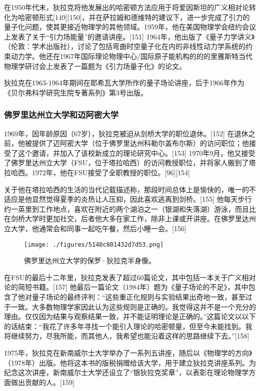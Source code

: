 在1950年代末，狄拉克将他发展出的哈密顿方法应用于将爱因斯坦的广义相对论转化为哈密顿形式[149][150]，并在萨拉姆和德维特的建议下，进一步完成了引力的量子化问题，使其更接近物理学的其他领域。1959年，他在美国物理学会纽约会议上发表了关于“引力场能量”的邀请讲座。[151] 1964年，他出版了《量子力学讲义》（伦敦：学术出版社），讨论了包括弯曲时空量子化在内的非线性动力学系统的约束动力学。他还在1967年国际理论物理中心/国际原子能机构的的的里雅斯特当代物理学研讨会上发表了一篇题为《引力场量子化》的论文。

狄拉克在1963-1964年期间在耶希瓦大学所作的量子场论讲座，后于1966年作为《贝尔弗科学研究生院专著系列》第3号出版。
\subsubsection{佛罗里达州立大学和迈阿密大学}
1969年，因年龄原因（67岁），狄拉克被迫从剑桥大学的职位退休。[152] 在退休之前，他被提供了迈阿密大学（位于佛罗里达州科勒尔盖布尔斯）的访问职位；他接受了这个邀请，并加入了该校新成立的理论研究中心。[153] 1970年9月，他又接受了佛罗里达州立大学（FSU，位于塔拉哈西）的访问教授职位，并将家人搬到了塔拉哈西。1972年，他在FSU接受了全职教授的职位。[96][154]

关于他在塔拉哈西的生活的当代记载描述称，那段时间总体上是愉快的，唯一的不适应是他显然觉得夏季的炎热让人压抑，因此喜欢逃离到剑桥。[155] 他每天步行约一英里到工作地点，喜欢在附近的两个湖泊之一（银湖和失落湖）游泳，而且比在剑桥大学时更加社交，后者他大多在家工作，除非上课或开讲座。在佛罗里达州立大学，他通常会和同事一起吃午餐，然后小睡一会。[156]
\begin{figure}[ht]
\centering
\texttt{[image: ./figures/5140c801432d7d53.png]}
\caption{佛罗里达州立大学的保罗·狄拉克半身像。} \label{fig_DLK1_6}
\end{figure}
在FSU的最后十二年里，狄拉克发表了超过60篇论文，其中包括一本关于广义相对论的简短书籍。[157] 他最后一篇论文（1984年）题为《量子场论的不足》，其中包含了他对量子场论的最终评判：“这些重正化规则与实验结果出奇地一致，甚至过于一致。大多数物理学家因此认为这些规则是正确的。我觉得这并不是一个充分的理由。仅仅因为结果与观察结果一致，并不能证明理论是正确的。”这篇论文以以下的话结束：“我花了许多年寻找一个能引入理论的哈密顿量，但至今未能找到。我将继续努力，尽我所能，而其他人，我希望也能沿着这样的思路继续下去。”[158]

1975年，狄拉克在新南威尔士大学举办了一系列五讲座，随后以《物理学的方向》（1978年）出版。他将这本书的版税捐赠给该大学，用于建立狄拉克讲座系列。为纪念这次讲座，新南威尔士大学还设立了“银狄拉克奖章”，以表彰在理论物理学方面做出贡献的人。[159]
